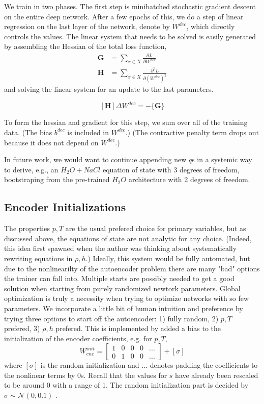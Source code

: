 \documentclass[]{article}
\begin{document}
We train in two phases. The first step is minibatched stochastic
gradient descent on the entire deep network. After a few epochs of this,
we do a step of linear regression on the last layer of the network,
denote by \(W^{dec}\), which directly controls the values. The linear
system that needs to be solved is easily generated by assembling the
Hessian of the total loss function,
\begin{align}
 \mathbf{G} &= \sum_{x\in X}\frac{\partial L}{\partial W^{dec}} \\
\mathbf{H} &= \sum_{x\in X}\frac{\partial^2 L}{\partial (W^{dec})^2}
\end{align}
and solving the linear system for an update to the last parameters.

\[[\mathbf{H}] \Delta W^{dec} = -\{\mathbf{G}\}\]

To form the hessian and gradient for this step, we sum over all of the
training data. (The bias \(b^{dec}\) is included in \(W^{dec}\).) (The
contractive penalty term drops out because it does not depend on
\(W^{dec}\).)

In future work, we would want to continue appending new \(q\)s in a
systemic way to derive, e.g., an \(H_2O + NaCl\) equation of state with
3 degrees of freedom, bootstraping from the pre-trained \(H_2O\)
architecture with 2 degrees of freedom.

\hypertarget{header-n3312}{%
\subsection{Encoder Initializations}\label{header-n3312}}

The properties \(p,T\) are the usual prefered choice for primary
variables, but as discussed above, the equations of state are not
analytic for any choice. (Indeed, this idea first spawned when the
author was thinking about systematically rewriting equations in
\(\rho,h\).) Ideally, this system would be fully automated, but due to
the nonlinearilty of the autoencoder problem there are many "bad"
options the trainer can fall into. Multiple starts are possibly needed
to get a good solution when starting from purely randomized newtork
parameters. Global optimization is truly a necessity when trying to
optimize networks with so few parameters. We incorporate a little bit of
human intuition and preference by trying three options to start off the
autoencoder: 1) fully random, 2) \(p,T\) prefered, 3) \(\rho,h\)
prefered. This is implemented by added a bias to the initialization of
the encoder coefficients, e.g. for \(p,T\),
\begin{equation}
 W^{init}_{enc} = \left[\begin{array}{ccccc}
1 & 0 & 0 & 0 & ... \\
0 & 1 & 0 & 0 & ...
                        \end{array}\right]+[\sigma]
\end{equation}
where \([\sigma]\) is the random initialization and \(…\) denotes
padding the coefficients to the nonlinear terms by 0s. Recall that the
values for \(s\) have already been rescaled to be around 0 with a range
of 1. The random initialization part is decided by
\(\sigma \sim \mathcal{N}(0,0.1)\) .
\end{document}
